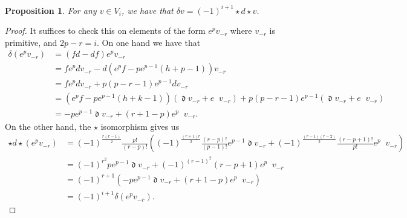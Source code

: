 \documentclass{amsart}
\newtheorem{prop}[theorem]{Proposition}
\DeclareMathOperator{\dee}{\mathfrak{d}}
\DeclareMathOperator{\deebar}{\overline{\mathfrak{d}}}
\theoremstyle{definition}
\begin{document}
\begin{prop}
    For any $v\in V_{i}$, we have that $\delta v = (-1)^{i+1}\star d\star v$.
\end{prop}
\begin{proof}
    It suffices to check this on elements of the form $e^pv_{-r}$ where $v_{-r}$ is primitive, and $2p-r=i$. On one hand we have that
    \begin{align*}
        \delta (e^pv_{-r}) &= (fd-df)e^pv_{-r} \\
        &=fe^p dv_{-r} - d(e^pf - pe^{p-1}(h+p-1))v_{-r} \\
        &= fe^p dv_{-r} +p(p-r-1)e^{p-1}dv_{-r} \\
        &=(e^pf - pe^{p-1}(h+k-1))(\dee v_{-r} + e\deebar v_{-r}) + p(p-r-1)e^{p-1}(\dee v_{-r}+e \deebar v_{-r}) \\
        &=-pe^{p-1}\dee v_{-r}+ (r+1-p)e^p \deebar v_{-r}.
    \end{align*}
    On the other hand, the $\star$ isomorphism gives us
    \begin{align*}
        \star d \star (e^pv_{-r}) &= (-1)^{\frac{r(r-1)}{2}}\frac{p!}{(r-p)!}\left( (-1)^{\frac{(r+1)r}{2}}\frac{(r-p)!}{(p-1)!}e^{p-1}\dee v_{-r} + (-1)^{\frac{(r-1)(r-2)}{2}} \frac{(r-p+1)!}{p!} e^{p}\deebar v_{-r} \right) \\
        &=(-1)^{r^2}pe^{p-1}\dee v_{-r} + (-1)^{(r-1)^2}(r-p+1) e^p \deebar v_{-r} \\
        &=(-1)^{r+1}(-pe^{p-1}\dee v_{-r} +(r+1-p)e^p \deebar v_{-r}) \\
        &=(-1)^{i+1} \delta(e^pv_{-r}).
    \end{align*}
    
\end{proof}
\end{document}
